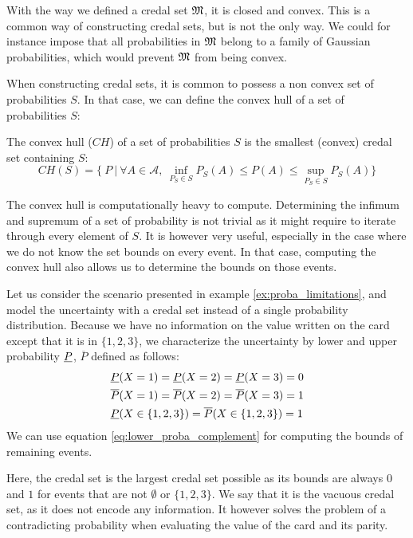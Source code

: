 \begin{remark}
    With the way we defined a credal set ${\mathfrak{M}}$, it is closed and convex. This is a common way of constructing credal sets, but is not the only way. We could for instance impose that all probabilities in ${\mathfrak{M}}$ belong to a family of Gaussian probabilities, which would prevent ${\mathfrak{M}}$ from being convex.
\end{remark}

When constructing credal sets, it is common to possess a non convex set of probabilities $S$. In that case, we can define the convex hull of a set of probabilities $S$:
\begin{definition}\label{def:convex_hull}
    The convex hull ($CH$) of a set of probabilities $S$ is the smallest (convex) credal set containing $S$:
    \begin{equation}
        CH(S) = \{~P~|~\forall A\in\mathcal{A}, ~\inf_{P_S\in S}P_S(A)\leqslant P(A) \leqslant \sup_{P_S\in S}P_S(A)\}
    \end{equation}
\end{definition}

\begin{remark}
    The convex hull is computationally heavy to compute. Determining the infimum and supremum of a set of probability is not trivial as it might require to iterate through every element of $S$. It is however very useful, especially in the case where we do not know the set bounds on every event. In that case, computing the convex hull also allows us to determine the bounds on those events.
\end{remark}

\begin{example}
    Let us consider the scenario presented in example \ref{ex:proba_limitations}, and model the uncertainty with a credal set instead of a single probability distribution. Because we have no information on the value written on the card except that it is in $\{1,2,3\}$, we characterize the uncertainty by lower and upper probability ${\underline{P}}$, $\overline{P}$ defined as follows:
    \begin{align*}
        &{\underline{P}}(X=1) = {\underline{P}}(X=2)= {\underline{P}}(X=3) = 0\\
        &\overline{P}(X=1) = \overline{P}(X=2)= \overline{P}(X=3) = 1\\
        &{\underline{P}}(X\in\{1,2,3\}) = \overline{P}(X\in\{1,2,3\}) = 1
    \end{align*}
    We can use equation \eqref{eq:lower_proba_complement} for computing the bounds of remaining events.
    
    Here, the credal set is the largest credal set possible as its bounds are always $0$ and $1$ for events that are not $\emptyset$ or $\{1,2,3\}$. We say that it is the vacuous credal set, as it does not encode any information. It however solves the problem of a contradicting probability when evaluating the value of the card and its parity.
\end{example}

